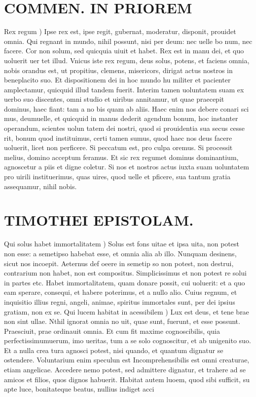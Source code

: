 \documentclass{article}
\begin{document}
\begin{pages}
\section*{COMMEN. IN PRIOREM }
\marginpar{[ p.176 ]}\pstart Rex regum ) Ipse rex est, ipse regit, gubernat, moderatur, disponit, prouidet omnia. Qui regnant in mundo, nihil possunt, nisi per deum: nec uelle bo num, nec facere. Cor non solum, sed quicquia uiuit et habet. Rex est in manu dei, et quo uoluerit uer tet illud. Vnicus iste rex regum, deus solus, potens, et faciens omnia, nobis orandus est, ut propitius, clemens, misericors, dirigat actus nostros in beneplacito suo. Et dispositionem dei in hoc mundo hu militer et pacienter amplectamur, quicquid illud tandem fuerit. Interim tamen uoluntatem suam ex uerbo suo discentes, omni studio et uiribus annitamur, ut quae praecepit dominus, haec fiant: tam a no bis quam ab aliis. Haec enim nos debere conari sci mus, deumuelle, et quicquid in manus dederit agendum bonum, hoc instanter operandum, scientes uolun tatem dei nostri, quod si prouidentia sua secus cesse rit, bonum quod instituimus, certi tamen sumus, quod haec nos deus facere uoluerit, licet non perficere. Si peccatum est, pro culpa oremus. Si processit melius, domino acceptum feramus. Et sic rex regumet dominus dominantium, agnoscetur a piis et digne coletur. Si nos et nostros actus iuxta suam uoluntatem pro uirili instituerimus, quas uires, quod uelle et pficere, sua tantum gratia assequamur, nihil nobis.  \pend
\section*{TIMOTHEI EPISTOLAM. }
\marginpar{[ p.177 ]}\pstart Qui solus habet immortalitatem ) Solus est fons uitae et ipsa uita, non potest non esse: a semetipso habebat esse, et omnia alia ab illo. Nunquam desinens, sicut nos incoepit. Aeternus def oeere in semetip so non potest, non destrui, contrarium non habet, non est compositus. Simplicissimus et non potest re solui in partes etc. Habet immortalitatem, quam donare possit, cui uoluerit: et a quo eam sperare, consequi, et habere poterimus, et a nullo alio. Cuius regnum, et inquisitio illius regni, angeli, animae, spiritus immortales sunt, per dei ipsius gratiam, non ex se.  \pend\pstart Qui lucem habitat in acessibilem ) Lux est deus, et tene brae non sint ullae. Nthil ignorat omnia no uit, quae sunt, fuerunt, et esse possunt. Praesciuit, prae ordinauit omnia. Et cum fit maxime cognoscibilis, quia perfectissimumuerum, imo ueritas, tum a se solo cognoscitur, et ab unigenito suo. Et a nulla crea tura agnosci potest, nisi quando, et quantum dignatur se ostendere. Voluntarium enim speculun est Incomprehensibilis est omni creaturae, etiam angelicae. Accedere nemo potest, sed admittere dignatur, et trahere ad se amicos et filios, quos dignos habuerit. Habitat autem luoem, quod sibi sufficit, su apte luce, bonitateque beatus, nullius indiget acci\pend

\end{pages}
\end{document}
